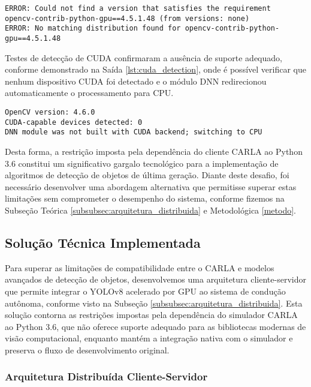 \begin{lstlisting}[style=cmdstyle, caption={Erro de instalação do OpenCV com suporte a CUDA.}, label={lst:opencv_cuda_install}]
ERROR: Could not find a version that satisfies the requirement 
opencv-contrib-python-gpu==4.5.1.48 (from versions: none)
ERROR: No matching distribution found for opencv-contrib-python-gpu==4.5.1.48
\end{lstlisting}

Testes de detecção de CUDA confirmaram a ausência de suporte adequado, conforme demonstrado na Saída \ref{lst:cuda_detection}, onde é possível verificar que nenhum dispositivo CUDA foi detectado e o módulo DNN redirecionou automaticamente o processamento para CPU.

\begin{lstlisting}[style=cmdstyle, caption={Resultado do teste de detecção de suporte a CUDA.}, label={lst:cuda_detection}]
OpenCV version: 4.6.0
CUDA-capable devices detected: 0
DNN module was not built with CUDA backend; switching to CPU
\end{lstlisting}

Desta forma, a restrição imposta pela dependência do cliente CARLA ao Python 3.6 constitui um significativo gargalo tecnológico para a implementação de algoritmos de detecção de objetos de última geração. Diante deste desafio, foi necessário desenvolver uma abordagem alternativa que permitisse superar estas limitações sem comprometer o desempenho do sistema, conforme fizemos na Subseção Teórica \ref{subsubsec:arquitetura_distribuida} e Metodológica \ref{metodo}.

\subsection{Solução Técnica Implementada} \label{subsec:solucao_tecnica}

Para superar as limitações de compatibilidade entre o CARLA e modelos avançados de detecção de objetos, desenvolvemos uma arquitetura cliente-servidor que permite integrar o YOLOv8 acelerado por GPU ao sistema de condução autônoma, conforme visto na Subseção \ref{subsubsec:arquitetura_distribuida}. Esta solução contorna as restrições impostas pela dependência do simulador CARLA ao Python 3.6, que não oferece suporte adequado para as bibliotecas modernas de visão computacional, enquanto mantém a integração nativa com o simulador e preserva o fluxo de desenvolvimento original.

\subsubsection{Arquitetura Distribuída Cliente-Servidor}


